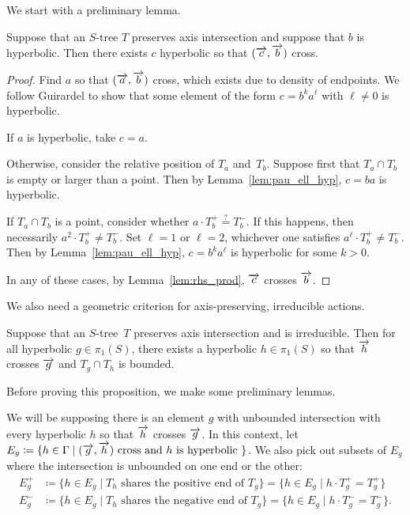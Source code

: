 We start with a preliminary lemma.
\begin{lemma}
Suppose that an $S$-tree $T$  preserves axis intersection and 
suppose that $b$ is hyperbolic. Then there exists $c$ hyperbolic so that $(\overrightarrow{c}, \overrightarrow{b})$ cross.
\label{lem:hyperbolic_crossing}
\end{lemma}
\begin{proof}
Find $a$ so that $(\overrightarrow{a},\overrightarrow{b})$ cross, which exists due to density of endpoints.
We follow Guirardel \cite[Fait 1.5 and the proof of Lemme 1.3, sous-cas 1.a, p.~853]{Gui05:Coeur} to show that some
element of the form $c = b^k a^\ell$ with $\ell \ne 0$ is hyperbolic.

If $a$ is hyperbolic, take $c=a$.

Otherwise, consider the relative
position of $T_a$ and~$T_b$.
Suppose first that $T_a \cap T_b$ is empty or larger than a point.
Then by Lemma~\ref{lem:pau_ell_hyp}, $c = ba$ is hyperbolic.

If $T_a \cap T_b$ is a point, consider whether $a \cdot T_b^+
\overset{?}{=} T_b^-$. If this happens, then
necessarily $a^2 \cdot T_b^+ \neq T_b^-$. Set $\ell = 1$ or $\ell = 2$,
whichever one satisfies $a^\ell \cdot T_b^+ \ne T_b^-$.
Then by Lemma~\ref{lem:pau_ell_hyp}, $c = b^ka^\ell$ is hyperbolic for some
$k>0$.

In any of these cases, by
Lemma~\ref{lem:rhs_prod}, $\overrightarrow{c}$ crosses $\overrightarrow{b}$.
\end{proof}


We also need a geometric criterion for axis-preserving,
irreducible actions.

\begin{proposition}
\label{prop:if_unbounded_then_reducible}
Suppose that an $S$-tree~$T$ preserves axis intersection and is
irreducible. Then for all
hyperbolic $g \in \pi_1(S)$,
there exists a hyperbolic $h \in \pi_1(S)$ so that $\overrightarrow{h}$
crosses $\overrightarrow{g}$ and $T_g \cap T_h$ is bounded.
\end{proposition}

Before proving this proposition, we make some preliminary lemmas.

We will be supposing there is an element $g$ with unbounded
intersection with every hyperbolic $h$ so that $\overrightarrow{h}$ crosses
$\overrightarrow{g}$.
In this context, let $E_g \coloneqq \{ h \in \Gamma \mid (\overrightarrow{g},\overrightarrow{h}) \mbox{ cross and } h \mbox{ is hyperbolic } \}$.
We also pick out subsets of $E_g$ where the intersection is unbounded
on one end or the other:
\begin{align*}
E_g^+
&\coloneqq
  \{ h \in E_g \mid T_h \text{ shares the positive end of } T_g \}
  = \{h \in E_g \mid h \cdot T_g^+ = T_g^+\}\\
E_g^-
&\coloneqq
  \{ h \in E_g \mid T_h \text{ shares the negative end of } T_g \}
  = \{h \in E_g \mid h \cdot T_g^- = T_g^-\}.
\end{align*}

